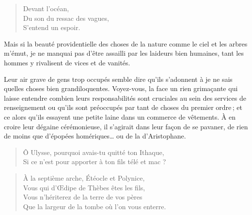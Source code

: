 \begin{verse}\haiku
  Devant l’océan,\\  %
  Du son du ressac des vagues,\\  %
  S’entend un espoir.
\end{verse}

\begin{prose}
  Mais si la beauté providentielle des choses de la nature comme le ciel et les arbres m’émut, je ne manquai pas d’être assailli par les laideurs bien humaines, tant les hommes y rivalisent de vices et de vanités. 

  Leur air grave de gens trop occupés semble dire qu’ils s’adonnent à je ne sais quelles choses bien grandiloquentes. Voyez-vous, la face un rien grimaçante qui laisse entendre combien leurs responsabilités sont cruciales au sein des services de renseignement ou qu’ils sont préoccupés par tant de choses du premier ordre\,; et ce alors qu’ils essayent une petite laine dans un commerce de vêtements. À en croire leur dégaine cérémonieuse, il s’agirait dans leur façon de se pavaner, de rien de moins que d’épopées homériques… ou de la  d’Aristophane. %
\end{prose}

\begin{verse}\distique
  Ô Ulysse, pourquoi avais-tu quitté ton Ithaque,\\ 
  Si ce n’est pour apporter à ton fils télé et mac%
   ?
\end{verse}

\begin{verse}\quatrain
  À la septième arche, Étéocle et Polynice,\\ 
  Vous qui d’Œdipe de Thèbes êtes les fils,\\ 
  Vous n’hériterez de la terre de vos pères\\ 
  Que la largeur de la tombe où l’on vous enterre.  %
\end{verse}

